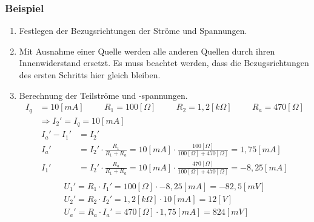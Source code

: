\subsubsection*{Beispiel}
\begin{enumerate}
    \item Festlegen der Bezugsrichtungen der Ströme und Spannungen.
    \item Mit Ausnahme einer Quelle werden alle anderen Quellen durch ihren Innenwiderstand ersetzt. Es muss beachtet werden, dass die Bezugsrichtungen des ersten Schritts hier gleich bleiben.
    \item Berechnung der Teilströme und -spannungen.
    \begin{align}
        I_q &= 10[mA] \hspace{1cm} R_1 = 100[\Omega] \hspace{1cm} R_2 = 1,2[k\Omega] \hspace{1cm} R_a = 470[\Omega] \\
        &\Rightarrow I_2' = I_q = 10[mA]
    \end{align}
    \begin{align}
        I_a' - I_1' &= I_2' \\
        I_a' &= I_2' \cdot \frac{R_1}{R_1 + R_a} = 10[mA] \cdot \frac{100 [\Omega]}{100 [\Omega] + 470[\Omega]} = 1,75[mA] \\
        I_1' &= I_2' \cdot \frac{R_a}{R_1 + R_a} = 10[mA] \cdot \frac{470 [\Omega]}{100 [\Omega] + 470[\Omega]} = -8,25[mA] \\
    \end{align}
    \begin{align}
        U_1' = R_1 \cdot I_1' = 100 [\Omega] \cdot -8,25[mA] = -82,5[mV] \\
        U_2' = R_2 \cdot I_2' = 1,2 [k\Omega] \cdot 10[mA] = 12[V] \\
        U_a' = R_a \cdot I_a' = 470 [\Omega] \cdot 1,75[mA] = 824[mV]        
    \end{align}


\end{enumerate}
